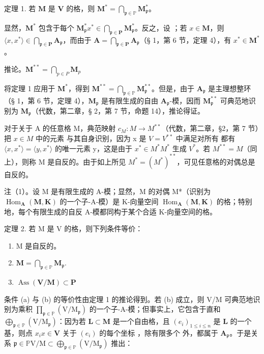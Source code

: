 定理 1. 若 \(\mathbf{M}\) 是 \(\mathbf{V}\) 的格，则 \(\mathbf{M}^{*} = \bigcap_{\mathfrak{p} \in \mathbb{P}} \mathbf{M}_{\mathfrak{p}}^{*}\)。

显然，\(\mathbf{M}^*\) 包含于每个 \(\mathbf{M}_{\mathfrak{p}}^{*}\)\(x^{*} \in \bigcap_{\mathfrak{p} \in \mathbf{P}} \mathbf{M}_{\mathfrak{p}}^{*}\)。反之，设 ；若 \(x \in \mathbf{M}\)，则 \(\langle x, x^{*} \rangle \in \bigcap_{\mathfrak{p} \in \mathbf{P}} \mathbf{A}_{\mathfrak{p}}\)，而由于 \(\mathbf{A} = \bigcap_{\mathfrak{p} \in \mathbf{P}} \mathbf{A}_{\mathfrak{p}}\)（§ 1，第 6 节，定理 4），有 \(x^{*} \in \mathbf{M}^{*}\)。

推论。\(\mathbf{M}^{**} = \bigcap_{p \in P}\mathbf{M}_{p}\)

将定理 1 应用于 \(\mathbf{M}^*\)，得到 \(\mathbf{M}^{**} = \bigcap_{\mathfrak{p}\in \mathbb{P}}\mathbf{M}_{\mathfrak{p}}^{**}\)。但是，由于 \(\mathbf{A}_{\mathfrak{p}}\) 是主理想整环（§ 1，第 6 节，定理 4），\(\mathbf{M}_{\mathfrak{p}}\) 是有限生成的自由 \(\mathbf{A}_{\mathfrak{p}}\)-模，因而 \(\mathbf{M}_{\mathfrak{p}}^{**}\) 可典范地识别为 \(\mathbf{M}_{\mathfrak{p}}\)（代数，第二章，§ 2，第 7 节，命题 14），推论得证。

对于关于 A 的任意格 M，典范映射 \(c_{M}: M \to M^{**}\)（代数，第二章，§2，第 7 节）把 \(x \in M\) 中的元素  与其自身识别，因为 x 是 \(V = V^{**}\) 中满足对所有  都有 \(\langle x, x^{*} \rangle = \langle y, x^{*} \rangle\) 的唯一元素 y，这是由于 \(x^{*} \in M^{*}\)\(M^{*}\) 生成 \(V^{*}\)。若 \(M^{**} = M\)（同上），则称 M 是自反的。由于如上所见 \(M^{*} = (M^{*})^{**}\)，可见任意格的对偶总是自反的。

注（1）。设 M 是有限生成的 A-模；显然，M 的对偶 M*（识别为 \(\operatorname{Hom}_{\mathbf{A}}(\mathbf{M}, \mathbf{K})\) 的一个子-A-模）是 K-向量空间 \(\operatorname{Hom}_{\mathbf{A}}(\mathbf{M}, \mathbf{K})\) 的格；特别地，每个有限生成的自反 A-模都同构于某个合适 K-向量空间的格。

定理 2. 若 M 是 V 的格，则下列条件等价：

\begin{enumerate}
\def\labelenumi{(\alph{enumi})}
\item
  M 是自反的。
\item
  \(\mathbf{M} = \bigcap_{\mathfrak{p}\in \mathbb{P}}\mathbf{M}_{\mathfrak{p}}.\)
\item
  \(\operatorname{Ass}(\mathbf{V} / \mathbf{M})\subset \mathbf{P}\)
\end{enumerate}

条件 (a) 与 (b) 的等价性由定理 1 的推论得到。若 (b) 成立，则 V/M 可典范地识别为乘积 \(\prod_{\mathfrak{p} \in \mathbb{P}} (\mathrm{V} / \mathrm{M}_{\mathfrak{p}})\) 的一个子-A-模；但事实上，它包含于直和 \(\bigoplus_{\mathfrak{p} \in \mathbb{P}} (\mathrm{V} / \mathrm{M}_{\mathfrak{p}})\)：因为若 \(\mathbf{L} \subset \mathbf{M}\) 是一个自由格，且 \((e_i)_{1 \leq i \leq n}\) 是 \(\mathbf{L}\) 的一个基，则点 \(x_i\)\(x \in \mathbf{V}\) 关于 \((e_i)\) 的每个坐标 ，除有限多个  外，都属于 \(\mathbf{A}_{\mathfrak{p}}\)。于是关系 \(\mathfrak{p} \in \mathbb{P}\)\(\mathrm{V} / \mathrm{M} \subset \bigoplus_{\mathfrak{p} \in \mathbb{P}} (\mathrm{V} / \mathrm{M}_{\mathfrak{p}})\) 推出：

